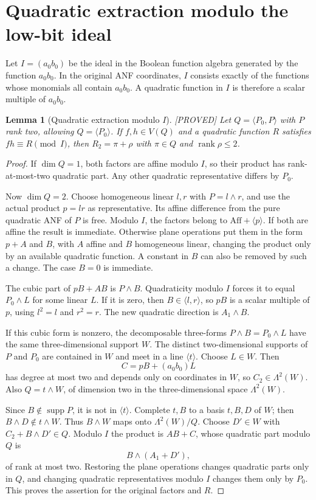 \documentclass[11pt,a4paper]{article}
\newtheorem{lemma}[theorem]{Lemma}
\newcommand{\Aff}{\mathrm{Aff}}
\newcommand{\rk}{\operatorname{rank}}
\newcommand{\supp}{\operatorname{supp}}
\newcommand{\status}[1]{\hfill\textsf{[#1]}}
\begin{document}
\section{Quadratic extraction modulo the low-bit ideal}
Let $I=(a_0b_0)$ be the ideal in the Boolean function algebra generated by the function $a_0b_0$. In the original ANF coordinates, $I$ consists exactly of the functions whose monomials all contain $a_0b_0$. A quadratic function in $I$ is therefore a scalar multiple of $a_0b_0$.

\begin{lemma}[Quadratic extraction modulo $I$]\label{lem:ideal}\status{PROVED}
Let $Q=\langle P_0,P\rangle$ with $P$ rank two, allowing $Q=\langle P_0\rangle$. If $f,h\in V(Q)$ and a quadratic function $R$ satisfies $fh\equiv R\pmod I$, then $R_2=\pi+\rho$ with $\pi\in Q$ and $\rk\rho\le2$.
\end{lemma}
\begin{proof}
If $\dim Q=1$, both factors are affine modulo $I$, so their product has rank-at-most-two quadratic part. Any other quadratic representative differs by $P_0$.

Now $\dim Q=2$. Choose homogeneous linear $l,r$ with $P=l\wedge r$, and use the actual product $p=lr$ as representative. Its affine difference from the pure quadratic ANF of $P$ is free. Modulo $I$, the factors belong to $\Aff+\langle p\rangle$. If both are affine the result is immediate. Otherwise plane operations put them in the form $p+A$ and $B$, with $A$ affine and $B$ homogeneous linear, changing the product only by an available quadratic function. A constant in $B$ can also be removed by such a change. The case $B=0$ is immediate.

The cubic part of $pB+AB$ is $P\wedge B$. Quadraticity modulo $I$ forces it to equal $P_0\wedge L$ for some linear $L$. If it is zero, then $B\in\langle l,r\rangle$, so $pB$ is a scalar multiple of $p$, using $l^2=l$ and $r^2=r$. The new quadratic direction is $A_1\wedge B$.

If this cubic form is nonzero, the decomposable three-forms $P\wedge B=P_0\wedge L$ have the same three-dimensional support $W$. The distinct two-dimensional supports of $P$ and $P_0$ are contained in $W$ and meet in a line $\langle t\rangle$. Choose $L\in W$. Then
\[
C=pB+(a_0b_0)L
\]
has degree at most two and depends only on coordinates in $W$, so $C_2\in\Lambda^2(W)$. Also $Q=t\wedge W$, of dimension two in the three-dimensional space $\Lambda^2(W)$.

Since $B\notin\supp P$, it is not in $\langle t\rangle$. Complete $t,B$ to a basis $t,B,D$ of $W$; then $B\wedge D\notin t\wedge W$. Thus $B\wedge W$ maps onto $\Lambda^2(W)/Q$. Choose $D'\in W$ with $C_2+B\wedge D'\in Q$. Modulo $I$ the product is $AB+C$, whose quadratic part modulo $Q$ is
\[
B\wedge(A_1+D'),
\]
of rank at most two. Restoring the plane operations changes quadratic parts only in $Q$, and changing quadratic representatives modulo $I$ changes them only by $P_0$. This proves the assertion for the original factors and $R$.
\end{proof}
\end{document}

